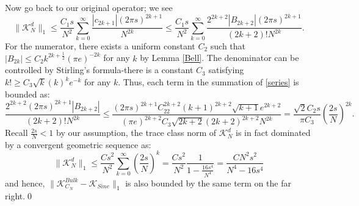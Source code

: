 \documentclass[11pt]{article}
\numberwithin{equation}{section}%
\numberwithin{theorem}{section}
\begin{document}
Now go back to our original operator; we see
\begin{equation}\label{series}
    \|\mathcal{K}_N^d\|_1\le\frac{C_1s}{N^2}\sum_{k=0}^\infty\frac{|c_{2k+1}|(2\pi s)^{2k+1}}{N^{2k}}\le\frac{C_1s}{N^2}\sum_{k=0}^\infty\frac{2^{2k+2}|B_{2k+2}|(2\pi s)^{2k+1}}{(2k+2)!N^{2k}}.
\end{equation}
For the numerator, there exists a uniform constant $C_2$ such that $|B_{2k}|\le C_2k^{2k+\frac{1}{2}}(\pi e)^{-2k}$ for any $k$ by Lemma \ref{Bell}. The denominator can be controlled by Stirling's formula-there is a constant $C_3$ satisfying $k!\ge C_3\sqrt{k}(k)^ke^{-k}$ for any $k$. Thus, each term in the summation of \eqref{series} is bounded as:
\begin{equation*}
        \frac{2^{2k+2}(2\pi s)^{2k+1}|B_{2k+2}|}{(2k+2)!N^{2k}}\le\frac{(2\pi s)^{2k+1}C_22^{2k+2}(k+1)^{2k+2}\sqrt{k+1}e^{2k+2}}{(\pi e)^{2k+2}C_3\sqrt{2k+2}(2k+2)^{2k+2}N^{2k}}=\frac{\sqrt2C_2s}{\pi C_3}\left(\frac{2s}{N}\right)^{2k}.
\end{equation*}
Recall $\frac{2s}{N}<1$ by our assumption, the trace class norm of $\mathcal{K}_N^d$ is in fact dominated by a convergent geometric sequence as:
\begin{equation*}
\|\mathcal{K}_N^d\|_1\le\frac{Cs^2}{N^2}\sum_{k=0}^\infty\left(\frac{2s}{N}\right)^k=\frac{Cs^2}{N^2}\frac{1}{1-\frac{16s^4}{N^4}}=\frac{CN^2s^2}{N^4-16s^4}
\end{equation*}
and hence, $\|\mathcal{K}_{C_N}^{Bulk}-\mathcal{K}_{Sine}\|_1$ is also bounded by the same term on the far right.\qed
\end{document}
